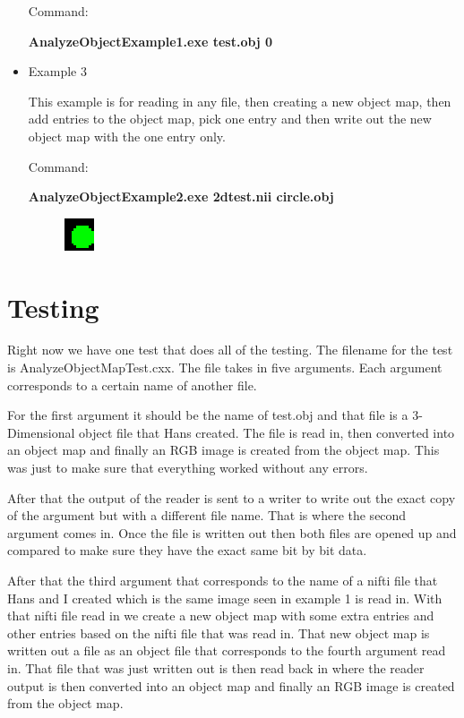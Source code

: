 \documentclass{InsightArticle}
\begin{document}
\begin{itemize}
Command:

\textbf{AnalyzeObjectExample1.exe test.obj 0}

\item Example 3

This example is for reading in any file, then creating a new object map, then add entries to the object map, pick one entry and then write out the new object map with the one entry only.

Command:

\textbf{AnalyzeObjectExample2.exe 2dtest.nii circle.obj}

\begin{figure}[h]
\center
\includegraphics[width=.14\textwidth]{circle.eps}
\label{fig:StreamingConceptDiagram}
\end{figure}


\end{itemize}

\section{Testing}

Right now we have one test that does all of the testing.  The filename for the test is AnalyzeObjectMapTest.cxx.  The file takes in five arguments.
Each argument corresponds to a certain name of another file.  

For the first argument it should be the name of test.obj and that file is a 3-Dimensional object file that Hans created.  The file is read in, then converted into an object map and finally an RGB image is created from the object map.  This was just to make sure that everything worked without any errors.  

After that the output of the reader is sent to a writer to write out the exact copy of the argument but with a different file name.  That is where the second argument comes in.  Once the file is written out then both files are opened up and compared to make sure they have the exact same bit by bit data.  

After that the third argument that corresponds to the name of a nifti file that Hans and I created which is the same image seen in example 1 is read in.  With that nifti file read in we create a new object map with some extra entries and other entries based on the nifti file that was read in.  That new object map is written out a file as an object file that corresponds to the fourth argument read in.  That file that was just written out is then read back in where the reader output is then converted into an object map and finally an RGB image is created from the object map.  
\end{document}
